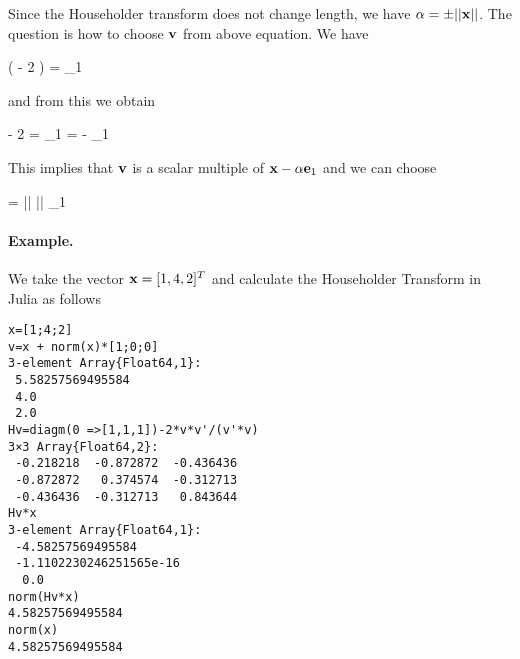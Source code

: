 Since the Householder transform does not change length, we have $\alpha = \pm || \mathbf{x}||$. The question is how to choose $\mathbf{v}$ from above equation. We have

\bee
\left( \Ibf - 2  \right) \xbf = \alpha \ebf_1
\eee

and from this we obtain

\bee
\xbf - 2  \xbf = \alpha \ebf_1   \vbf = \xbf - \alpha \ebf_1
\eee

This implies that $\mathbf{v}$ is a scalar multiple of $\mathbf{x} - \alpha \mathbf{e}_1$ and we can choose

\bee
\vbf = \xbf \pm || \xbf || \ebf_1
\eee

\paragraph{Example.} We take the vector $\mathbf{x}=[1, 4, 2]^T$ and calculate the Householder Transform in Julia as follows

\begin{verbatim}
x=[1;4;2]
v=x + norm(x)*[1;0;0]
3-element Array{Float64,1}:
 5.58257569495584
 4.0             
 2.0             
Hv=diagm(0 =>[1,1,1])-2*v*v'/(v'*v)
3×3 Array{Float64,2}:
 -0.218218  -0.872872  -0.436436
 -0.872872   0.374574  -0.312713
 -0.436436  -0.312713   0.843644
Hv*x
3-element Array{Float64,1}:
 -4.58257569495584      
 -1.1102230246251565e-16
  0.0
norm(Hv*x)
4.58257569495584
norm(x)
4.58257569495584

\end{verbatim}



